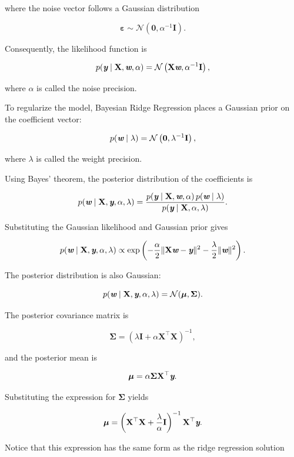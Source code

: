 \documentclass[14pt]{extarticle}
\def\mathbi#1{\textbf{\em #1}}
\begin{document}
where the noise vector follows a Gaussian distribution

\[
\boldsymbol{\varepsilon}
\sim
\mathcal{N}
\left(
\mathbf{0},
\alpha^{-1}\mathbf{I}
\right).
\]

Consequently, the likelihood function is

\[
p(\mathbi{y}\mid \mathbf{X},\mathbi{w},\alpha)
=
\mathcal{N}
\left(
\mathbf{X}\mathbi{w},
\alpha^{-1}\mathbf{I}
\right),
\]

where $\alpha$ is called the noise precision.

To regularize the model, Bayesian Ridge Regression places a Gaussian prior on the coefficient vector:

\[
p(\mathbi{w}\mid \lambda)
=
\mathcal{N}
\left(
\mathbf{0},
\lambda^{-1}\mathbf{I}
\right),
\]

where $\lambda$ is called the weight precision.

Using Bayes' theorem, the posterior distribution of the coefficients is

\[
p(\mathbi{w}\mid \mathbf{X},\mathbi{y},\alpha,\lambda)
=
\frac{
p(\mathbi{y}\mid \mathbf{X},\mathbi{w},\alpha)
\,p(\mathbi{w}\mid \lambda)
}{
p(\mathbi{y}\mid \mathbf{X},\alpha,\lambda)
}.
\]

Substituting the Gaussian likelihood and Gaussian prior gives

\[
p(\mathbi{w}\mid \mathbf{X},\mathbi{y},\alpha,\lambda)
\propto
\exp
\left(
-\frac{\alpha}{2}
\|\mathbf{X}\mathbi{w}-\mathbi{y}\|^2
-\frac{\lambda}{2}
\|\mathbi{w}\|^2
\right).
\]

The posterior distribution is also Gaussian:

\[
p(\mathbi{w}\mid \mathbf{X},\mathbi{y},\alpha,\lambda)
=
\mathcal{N}
(
\boldsymbol{\mu},
\mathbf{\Sigma}
).
\]

The posterior covariance matrix is

\[
\mathbf{\Sigma}
=
\left(
\lambda\mathbf{I}
+
\alpha\mathbf{X}^{\top}\mathbf{X}
\right)^{-1},
\]

and the posterior mean is

\[
\boldsymbol{\mu}
=
\alpha
\mathbf{\Sigma}
\mathbf{X}^{\top}
\mathbi{y}.
\]

Substituting the expression for $\mathbf{\Sigma}$ yields

\[
\boldsymbol{\mu}
=
\left(
\mathbf{X}^{\top}\mathbf{X}
+
\frac{\lambda}{\alpha}\mathbf{I}
\right)^{-1}
\mathbf{X}^{\top}
\mathbi{y}.
\]

Notice that this expression has the same form as the ridge regression solution
\end{document}
